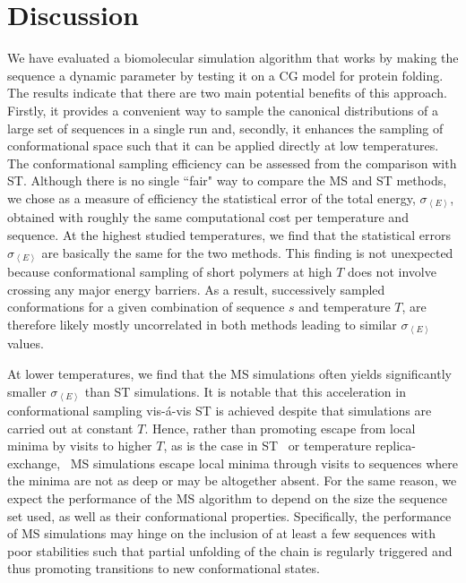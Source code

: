 \documentclass[
aip,
rsi,%
amsmath,amssymb,
reprint,%
]{revtex4-1}
\newcommand	 {\sbar}	{{s}}
\newcommand {\sigE}	{{\sigma_{\left < E \right >}}}
\begin{document}
\section{Discussion}
\noindent
We have evaluated a biomolecular simulation algorithm that works by making the sequence a dynamic parameter by testing it on a CG model for protein folding. The results indicate that there are two main potential benefits of this approach. Firstly, it provides a convenient way to sample the canonical distributions of a large set of sequences in a single run and, secondly, it enhances the sampling of conformational space such that it can be applied directly at low temperatures. The conformational sampling efficiency can be assessed from the comparison with ST. Although there is no single ``fair" way to compare the MS and ST methods, we chose as a measure of efficiency the statistical error of the total energy, $\sigE$, obtained with roughly the same computational cost per temperature and sequence. At the highest studied temperatures, we find that the statistical errors $\sigE$ are basically the same for the two methods. This finding is not unexpected because conformational sampling of short polymers at high $T$ does not involve crossing any major energy barriers. As a result, successively sampled conformations for a given combination of sequence $\sbar$ and temperature $T$, are therefore likely mostly uncorrelated in both methods leading to similar $\sigE$ values. 

At lower temperatures, we find that the MS simulations often yields significantly smaller $\sigE$ than ST simulations. It is notable that this acceleration in conformational sampling vis-{\'a}-vis ST is achieved despite that simulations are carried out at constant $T$. Hence, rather than promoting escape from local minima by visits to higher $T$, as is the case in  ST~\cite{Marinari1992,Lyubartsev1992} or temperature replica-exchange,~\cite{Swendsen1986}  MS simulations escape local minima through visits to sequences where the minima are not as deep or may be altogether absent. For the same reason, we expect the performance of the MS algorithm to depend on the size the sequence set used, as well as their conformational properties.  Specifically, the performance of MS simulations may hinge on the inclusion of at least a few sequences with poor stabilities such that partial unfolding of the chain is regularly triggered and thus promoting transitions to new conformational states. 
\end{document}

